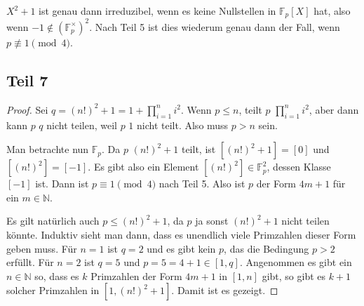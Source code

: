 \documentclass[10pt,a4paper]{article}
\begin{document}
$X^{2} + 1$ ist genau dann irreduzibel, wenn es keine Nullstellen in $\mathbb{F}_{p}[X]$ hat, also wenn $-1 \not\in (\mathbb{F}_{p}^{\times})^{2}$.
Nach Teil 5 ist dies wiederum genau dann der Fall, wenn $p \not\equiv 1 \pmod 4$.

\subsection{Teil 7}

\begin{proof}
  Sei $q = (n!)^{2} + 1 = 1 + \prod_{i = 1}^{n} i^{2}$.
  Wenn $p \le n$, teilt $p$ $\prod_{i = 1}^{n} i^{2}$, aber dann kann $p$ $q$ nicht teilen, weil $p$ $1$ nicht teilt.
  Also muss $p > n$ sein.

  Man betrachte nun $\mathbb{F}_{p}$.
  Da $p$ $(n!)^{2} + 1$ teilt, ist $[(n!)^{2} + 1] = [0]$ und $[(n!)^{2}] = [-1]$.
  Es gibt also ein Element $[(n!)^{2}] \in \mathbb{F}_{p}^{2}$, dessen Klasse $[-1]$ ist.
  Dann ist $p \equiv 1 \pmod 4$ nach Teil 5.
  Also ist $p$ der Form $4m + 1$ für ein $m \in \mathbb{N}$.

  Es gilt natürlich auch $p \le (n!)^{2} + 1$, da $p$ ja sonst $(n!)^{2} + 1$ nicht teilen könnte.
  Induktiv sieht man dann, dass es unendlich viele Primzahlen dieser Form geben muss.
  Für $n = 1$ ist $q = 2$ und es gibt kein $p$, das die Bedingung $p > 2$ erfüllt.
  Für $n = 2$ ist $q = 5$ und $p = 5 = 4 + 1 \in [1, q]$.
  Angenommen es gibt ein $n \in \mathbb{N}$ so, dass es $k$ Primzahlen der Form $4m + 1$ in $[1, n]$ gibt, so gibt es $k + 1$ solcher Primzahlen in $[1, (n!)^{2} + 1]$.
  Damit ist es gezeigt.
\end{proof}
\end{document}
